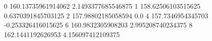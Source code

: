 0 160.13735961914062 2.1493377685546875
1 158.62506103515625 0.6370391845703125
2 157.98802185058594 0.0
4 157.7346954345703 -0.253326416015625
6 160.9832305908203 2.995208740234375
8 162.1441192626953 4.156097412109375
